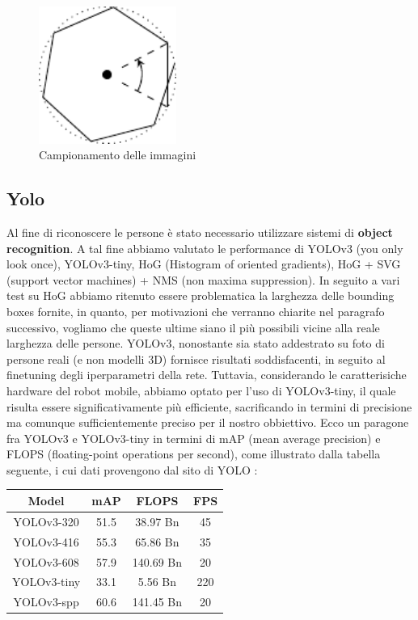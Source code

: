 \documentclass[a4paper]{article}
\begin{document}
	\begin{figure}[H]
		\centering
		\includegraphics[width=0.4\textwidth]{./img/pictures_sampling.pdf}
		\caption{Campionamento delle immagini}
		\label{fig:campionamento_immagini}
	\end{figure}
	
	\subsection{Yolo}\label{subsec:Yolo}
	Al fine di riconoscere le persone è stato necessario utilizzare sistemi di \textbf{object recognition}. A tal fine abbiamo valutato le performance di YOLOv3 (you only look once), YOLOv3-tiny, HoG (Histogram of oriented gradients), HoG + SVG (support vector machines) + NMS (non maxima suppression).
	In seguito a vari test su HoG abbiamo ritenuto essere problematica la larghezza delle bounding boxes fornite, in quanto, per motivazioni che verranno chiarite nel paragrafo successivo, vogliamo che queste ultime siano il più possibili vicine alla reale larghezza delle persone. YOLOv3, nonostante sia stato addestrato su foto di persone reali (e non modelli 3D) fornisce risultati soddisfacenti, in seguito al finetuning degli iperparametri della rete. Tuttavia, considerando le caratterisiche hardware del robot mobile, abbiamo optato per l'uso di YOLOv3-tiny, il quale risulta essere significativamente più efficiente, sacrificando in termini di precisione ma comunque sufficientemente preciso per il nostro obbiettivo. Ecco un paragone fra YOLOv3 e YOLOv3-tiny in termini di mAP (mean average precision) e FLOPS (floating-point operations per second), come illustrato dalla tabella seguente, i cui dati provengono dal sito di YOLO \cite{yolo}:
	
	\begin{center}
		\begin{tabular}{ |c|c|c|c| } 
			\hline
			Model & mAP & FLOPS & FPS \\
			\hline	
			 YOLOv3-320    & 51.5  &  38.97  Bn  &  45  \\ 
			 YOLOv3-416    & 55.3  &  65.86  Bn  &  35  \\ 
			 YOLOv3-608    & 57.9  &  140.69 Bn  &  20  \\ 
			 YOLOv3-tiny   & 33.1  &  5.56   Bn  &  220 \\
			 YOLOv3-spp    & 60.6  &  141.45 Bn  &  20  \\
			\hline
		\end{tabular}
	\end{center}
\end{document}
